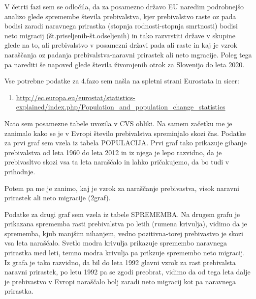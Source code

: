 \documentclass[11pt,a4paper]{article}
\begin{document}
V četrti fazi sem se odločila, da za posamezno državo EU naredim podrobnejšo analizo glede spremembe števila prebivalstva, kjer prebivalstvo raste oz pada bodisi zaradi naravnega prirastka (stopnja rodnosti-stopnja smrtnosti) bodisi neto migracij (št.priseljenih-št.odseljenih) in tako razvrstiti države v skupine glede na to, ali prebivalstvo v posamezni državi pada ali raste in kaj je vzrok naraščanja oz padanja prebivalstva-naravni prirastek ali neto mgracije.
Poleg tega pa narediti še napoved glede števila živorojenih otrok za Slovenijo do leta 2020.

Vse potrebne podatke za 4.fazo sem našla na spletni strani Eurostata in sicer:
\begin{enumerate}
\item{\url{http://ec.europa.eu/eurostat/statistics-explained/index.php/Population_and_population_change_statistics}}
\end{enumerate}

Nato sem posamezne tabele uvozila v CVS obliki.
\newpage
Na samem začetku me je zanimalo kako se je v Evropi število prebivalstva spreminjalo skozi čas.
Podatke za prvi graf sem vzela iz tabela POPULACIJA.
Prvi graf tako prikazuje gibanje prebivalstva od leta 1960 do leta 2012 in iz njega je lepo razvidno, da je prebivasltvo skozi vsa ta leta naraščalo in lahko pričakujemo, da bo tudi v prihodnje. 



Potem pa me je zanimo, kaj je vzrok za naraščanje prebivastva, visok naravni prirastek ali neto migracije (2graf).

\newpage

Podatke za drugi graf sem vzela iz tabele SPREMEMBA.
Na drugem grafu je prikazana sprememba rasti prebivalstva po letih (rumena krivulja), vidimo da je sprememba, kjub manjšim nihanjem, vedno pozitivna-torej prebivastvo je skozi vsa leta naraščalo. Svetlo modra krivulja prikazuje spremembo naravnega prirastka med leti, temno modra krivulja pa prikzuje spremembo neto migracij. Iz grafa je tako razvidno, da bil do leta 1992 glavni vzrok za rast prebivalsta naravni prirastek, po letu 1992 pa se zgodi preobrat, vidimo da od tega leta dalje je prebivastvo v Evropi naraščalo bolj zaradi neto migracij kot pa naravnega prirastka.



\newpage
\end{document}
